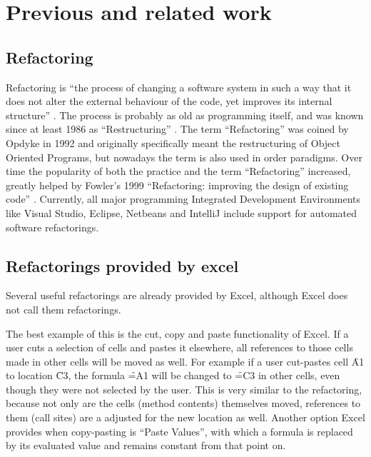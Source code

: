 
\chapter{Previous and related work}
\label{chapter:previouswork}

\section{Refactoring}

Refactoring is ``the process of changing a software system in such a way that it does not alter the external behaviour of the code, yet improves its internal structure'' \cite{opdyke1992refactoring}.
The process is probably as old as programming itself, and was known since at least 1986 as ``Restructuring'' \cite{arnold1986introduction}.
The term ``Refactoring'' was coined by Opdyke in 1992 \cite{opdyke1992refactoring} and originally specifically meant the restructuring of Object Oriented Programs, but nowadays the term is also used in order paradigms.
Over time the popularity of both the practice and the term ``Refactoring'' increased, greatly helped by Fowler's 1999 ``Refactoring: improving the design of existing code'' \cite{fowler1999refactoring}.
Currently, all major programming Integrated Development Environments like Visual Studio, Eclipse, Netbeans and IntelliJ include support for automated software refactorings.

\section{Refactorings provided by excel}

Several useful refactorings are already provided by Excel, although Excel does not call them refactorings.

The best example of this is the cut, copy and paste functionality of Excel.
If a user cuts a selection of cells and pastes it elsewhere, all references to those cells made in other cells will be moved as well.
For example if a user cut-pastes cell \f{A1} to location \f{C3}, the formula \f{=A1} will be changed to \f{=C3} in other cells, even though they were not selected by the user.
This is very similar to the  \cite{fowler1999refactoring} refactoring, because not only are the cells (method contents) themselves moved, references to them (call sites) are a adjusted for the new location as well.
Another option Excel provides when copy-pasting is ``Paste Values'', with which a formula is replaced by its evaluated value and remains constant from that point on.

